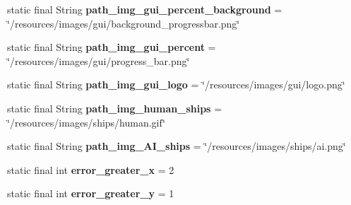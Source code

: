 \begin{DoxyCompactItemize}
static final String {\bfseries path\+\_\+img\+\_\+gui\+\_\+percent\+\_\+background} = \char`\"{}/resources/images/gui/background\+\_\+progressbar.\+png\char`\"{}
\item 
\mbox{\label{classfr_1_1groupe40_1_1projet_1_1util_1_1constants_1_1_constants_a0e72efcf8c17ab574b6431d41d7849b4}} 
static final String {\bfseries path\+\_\+img\+\_\+gui\+\_\+percent} = \char`\"{}/resources/images/gui/progress\+\_\+bar.\+png\char`\"{}
\item 
\mbox{\label{classfr_1_1groupe40_1_1projet_1_1util_1_1constants_1_1_constants_a3a04d2d768bafff61fe246fabe172ad7}} 
static final String {\bfseries path\+\_\+img\+\_\+gui\+\_\+logo} = \char`\"{}/resources/images/gui/logo.\+png\char`\"{}
\item 
\mbox{\label{classfr_1_1groupe40_1_1projet_1_1util_1_1constants_1_1_constants_a5f42a3cffd31e479d234891647bd4393}} 
static final String {\bfseries path\+\_\+img\+\_\+human\+\_\+ships} = \char`\"{}/resources/images/ships/human.\+gif\char`\"{}
\item 
\mbox{\label{classfr_1_1groupe40_1_1projet_1_1util_1_1constants_1_1_constants_a7a7e6b718c53d877bae963b79a616ce4}} 
static final String {\bfseries path\+\_\+img\+\_\+\+A\+I\+\_\+ships} = \char`\"{}/resources/images/ships/ai.\+png\char`\"{}
\item 
\mbox{\label{classfr_1_1groupe40_1_1projet_1_1util_1_1constants_1_1_constants_a891641408f73ec897fb9ea666801fd6a}} 
static final int {\bfseries error\+\_\+greater\+\_\+x} = 2
\item 
\mbox{\label{classfr_1_1groupe40_1_1projet_1_1util_1_1constants_1_1_constants_aef4f594de6c163e0556b0e50c88badb3}} 
static final int {\bfseries error\+\_\+greater\+\_\+y} = 1
\item 
\mbox{\label{classfr_1_1groupe40_1_1projet_1_1util_1_1constants_1_1_constants_abdfb30531d1c993a16019fd91bbb9f73}} 

\end{DoxyCompactItemize}
